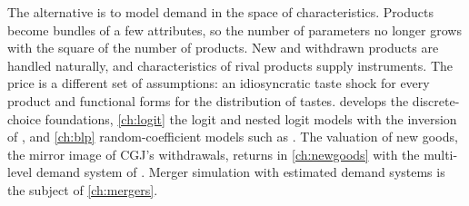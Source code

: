 The alternative is to model demand in the space of characteristics. Products become bundles of a few attributes, so
the number of parameters no longer grows with the square of the number of products. New and withdrawn products are
handled naturally, and characteristics of rival products supply instruments. The price is a different set of
assumptions: an idiosyncratic taste shock for every product and functional forms for the distribution of tastes.
 develops the discrete-choice foundations, \cref{ch:logit} the logit and nested logit models with the
inversion of \citet{Berry1994}, and \cref{ch:blp} random-coefficient models such as \citet{Nevo2001}. The valuation
of new goods, the mirror image of CGJ's withdrawals, returns in \cref{ch:newgoods} with the multi-level demand system
of \citet{Hausman1997}. Merger simulation with estimated demand systems is the subject of \cref{ch:mergers}.
